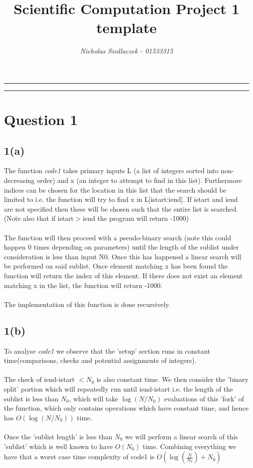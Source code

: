 \documentclass{article}
\title{Scientific Computation Project 1 template}
\author{\emph{Nicholas Siedlaczek - 01533315}}
\begin{document}
\maketitle

\hrule
\hrule

\section*{Question 1}


\subsection*{1(a)}
The function \emph{code1} takes primary inputs L (a list of integers sorted into non-decreasing order) and x (an integer to attempt to find in this list). Furthermore indices can be chosen for the location in this list that the search should be limited to i.e. the function will try to find x in L[istart:iend]. If istart and iend are not specified then these will be chosen such that the entire list is searched. (Note also that if istart$>$iend the program will return -1000) \\ \\
 The function will then proceed with a pseudo-binary search (note this could happen 0 times depending on parameters) until the length of the sublist under consideration is less than input N0. Once this has happened a linear search will be performed on said sublist. Once element matching x has been found the function will return the index of this element. If there does not exist an element matching x in the list, the function will return -1000. \\\\
The implementation of this function is done recursively.
\subsection*{1(b)}
To analyse \emph{code1} we observe that the 'setup' section runs in constant time(comparisons, checks and potential assignments of integers).\\ \\
The check of iend-istart $<N_0$ is also constant time. We then consider the 'binary split' portion which will repeatedly run until iend-istart i.e. the length of the sublist is less than $N_0$, which will take $\log(N/N_0)$ evaluations of this 'fork' of the function, which only contains operations which have constant time, and hence has $O(\log(N/N_0))$ time. \\ \\
Once the 'sublist length' is less than $N_0$ we will perform a linear search of this 'sublist' which is well known to have $O(N_0)$ time. Combining everything we have that a worst case time complexity of code1 is $O(\log(\frac{N}{N_0}) + N_0)$
\end{document}
